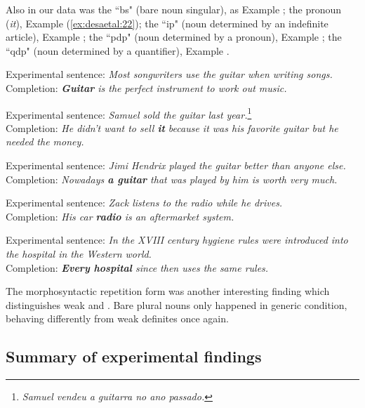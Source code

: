 \documentclass[output=paper,
modfonts
]{langscibook}
\begin{document}
Also in our data was the “bs" (bare noun singular), as Example ; the pronoun (\textit{it}), Example (\ref{ex:desaetal:22}); the “ip" (noun determined by an indefinite article), Example ; the “pdp" (noun determined by a pronoun), Example ; the “qdp" (noun determined by a quantifier), Example .


\ea \label{ex:desaetal:21}
{Experimental sentence:} \textit{Most songwriters use the guitar when writing songs.}
\\ {Completion:} \textit{\textbf{Guitar} is the perfect instrument to work out music.} 
\z

\ea \label{ex:desaetal:22}
{Experimental sentence:} \textit{Samuel sold the guitar last year.}\footnote{\textit{Samuel vendeu a guitarra no ano passado.}}
\\ {Completion:} \textit{He didn't want to sell \textbf{it} because it was his favorite guitar but he needed the money.} 
\z

\ea \label{ex:desaetal:23}
{Experimental sentence:} \textit{Jimi Hendrix played the guitar better than anyone else.}
\\ {Completion:} \textit{Nowadays \textbf{a guitar} that was played by him is worth very much.} 
\z

\ea \label{ex:desaetal:24}
{Experimental sentence:} \textit{Zack listens to the	 radio while he drives.}
\\ {Completion:} \textit{His car \textbf{radio} is an aftermarket system.} 
\z

\ea \label{ex:desaetal:25}
{Experimental sentence:} \textit{In the XVIII century hygiene rules were introduced into the hospital in the Western world.}
\\ {Completion:} \textit{ \textbf{Every hospital} since then uses the same rules.}
\z

The morphosyntactic repetition form was another interesting finding which distinguishes weak and . Bare plural nouns only happened in generic condition, behaving differently from weak definites once again.

\subsection{Summary of experimental findings}
\end{document}
